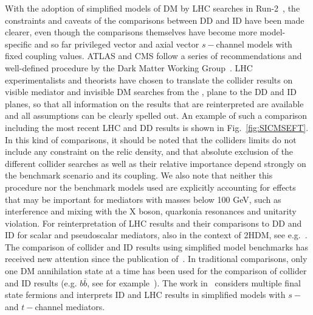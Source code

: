 With the adoption of simplified models of DM by LHC searches in Run-2~\cite{Abercrombie:2015wmb}, the
constraints and caveats of the comparisons between DD and ID have been made clearer, even though the comparisons themselves have become more model-specific and so far privileged vector and axial vector $s-$channel models with fixed coupling values. ATLAS and CMS follow a series of recommendations and well-defined procedure by the Dark Matter Working Group~\cite{Boveia:2016mrp}. LHC experimentalists and theorists have chosen to translate the collider results on visible mediator and invisible DM searches from the \mdm, \mmed plane to the DD and ID planes, so that all information on the results that are reinterpreted are available and all assumptions can be clearly spelled out. An example of such a comparison including the most recent LHC and DD results is shown in Fig.~\ref{fig:SICMSEFT}. In this kind of comparisons, it should be noted that the colliders limits do not include any constraint on the relic density, and that absolute exclusion of the different collider searches as well as their relative importance depend strongly on the benchmark scenario and its coupling. We also note that neither this procedure nor the benchmark models used are explicitly accounting for effects that may be important for mediators with masses below 100 GeV, such as interference and mixing with the X boson, quarkonia resonances and unitarity violation. 
For reinterpretation of LHC results and their comparisons to DD and ID for scalar and pseudoscalar mediators, also in the context of 2HDM, see e.g.~\cite{Athron:2017kgt,Banerjee:2017wxi,Ipek:2014gua,Bell:2016ekl}.
The comparison of collider and ID results using simplified model benchmarks has received new attention since the publication of~\cite{Boveia:2016mrp}. In traditional comparisons, only one DM annihilation state at a time has been used for the comparison of collider and ID results (e.g. $b\bar{b}$, see for example~\cite{Agrawal:2014una}). The work in~\cite{Carpenter:2016thc} considers multiple final state fermions and interprets ID and LHC results in simplified models with $s-$ and $t-$channel mediators. 

